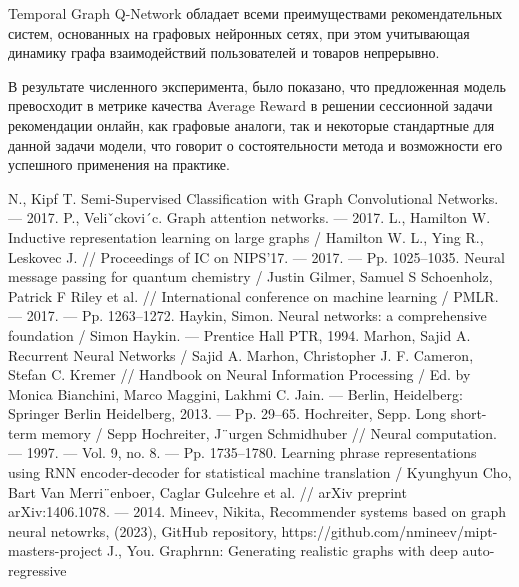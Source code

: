 \documentclass[a4paper,14pt,oneside]{mipt-thesis-ms}
\begin{document}
Temporal Graph Q-Network обладает всеми преимуществами рекомендательных систем, основанных на графовых нейронных сетях, при этом учитывающая динамику графа взаимодействий пользователей и товаров непрерывно. 

В результате численного эксперимента, было показано, что предложенная модель превосходит в метрике качества Average Reward в решении сессионной задачи рекомендации онлайн, как графовые аналоги, так и некоторые стандартные для данной задачи модели, что говорит о состоятельности метода и возможности его успешного применения на практике.

\backmatter

\begin{thebibliography}{99}
        N., Kipf T. Semi-Supervised Classification with Graph Convolutional Networks. — 2017.
        P., Veliˇckovi´c. Graph attention networks. — 2017.
        L., Hamilton W. Inductive representation learning on large graphs / Hamilton W. L., Ying R., Leskovec J. // Proceedings of IC on NIPS’17. — 2017.
— Pp. 1025–1035.
        Neural message passing for quantum chemistry / Justin Gilmer,
Samuel S Schoenholz, Patrick F Riley et al. // International conference
on machine learning / PMLR. — 2017. — Pp. 1263–1272.
        Haykin, Simon. Neural networks: a comprehensive foundation / Simon Haykin. — Prentice Hall PTR, 1994.
        Marhon, Sajid A. Recurrent Neural Networks / Sajid A. Marhon, Christopher J. F. Cameron, Stefan C. Kremer // Handbook on Neural Information
Processing / Ed. by Monica Bianchini, Marco Maggini, Lakhmi C. Jain.
— Berlin, Heidelberg: Springer Berlin Heidelberg, 2013. — Pp. 29–65.
        Hochreiter, Sepp. Long short-term memory / Sepp Hochreiter,
J¨urgen Schmidhuber // Neural computation. — 1997. — Vol. 9, no. 8.
— Pp. 1735–1780.
        Learning phrase representations using RNN encoder-decoder for statistical
machine translation / Kyunghyun Cho, Bart Van Merri¨enboer, Caglar Gulcehre et al. // arXiv preprint arXiv:1406.1078. — 2014.
        Mineev, Nikita, Recommender systems based on graph neural netowrks, (2023), GitHub repository, https://github.com/nmineev/mipt-masters-project
        J., You. Graphrnn: Generating realistic graphs with deep auto-regressive

\end{thebibliography}
\end{document}
